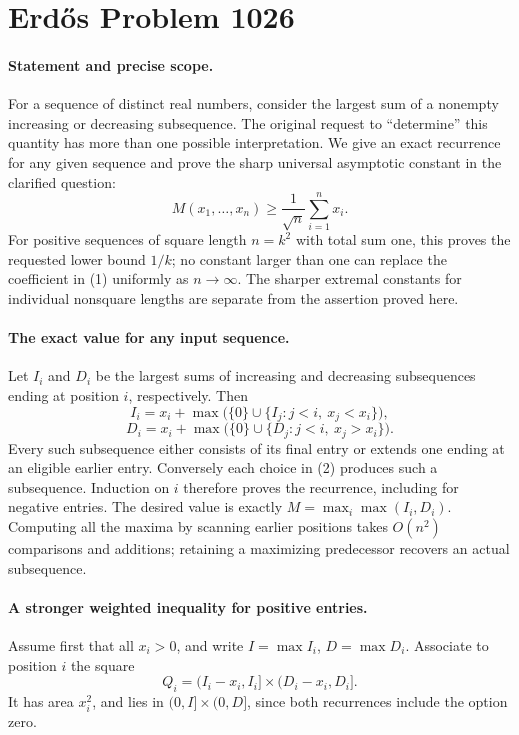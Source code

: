 \section*{Erd\H{o}s Problem 1026}

\paragraph{Statement and precise scope.}
For a sequence of distinct real numbers, consider the largest sum of a nonempty increasing or decreasing subsequence. The original request to ``determine'' this quantity has more than one possible interpretation. We give an exact recurrence for any given sequence and prove the sharp universal asymptotic constant in the clarified question:
\[
 M(x_1,\ldots,x_n)\geq\frac1{\sqrt n}\sum_{i=1}^n x_i.
 \tag{1}
\]
For positive sequences of square length \(n=k^2\) with total sum one, this proves the requested lower bound \(1/k\); no constant larger than one can replace the coefficient in (1) uniformly as \(n\to\infty\). The sharper extremal constants for individual nonsquare lengths are separate from the assertion proved here.

\paragraph{The exact value for any input sequence.}
Let \(I_i\) and \(D_i\) be the largest sums of increasing and decreasing subsequences ending at position \(i\), respectively. Then
\[
 I_i=x_i+\max\bigl(\{0\}\cup\{I_j:j<i,\ x_j<x_i\}\bigr),
\]
\[
 D_i=x_i+\max\bigl(\{0\}\cup\{D_j:j<i,\ x_j>x_i\}\bigr). \tag{2}
\]
Every such subsequence either consists of its final entry or extends one ending at an eligible earlier entry. Conversely each choice in (2) produces such a subsequence. Induction on \(i\) therefore proves the recurrence, including for negative entries. The desired value is exactly
\(M=\max_i\max(I_i,D_i)\). Computing all the maxima by scanning earlier positions takes \(O(n^2)\) comparisons and additions; retaining a maximizing predecessor recovers an actual subsequence.

\paragraph{A stronger weighted inequality for positive entries.}
Assume first that all \(x_i>0\), and write
\(I=\max I_i\), \(D=\max D_i\). Associate to position \(i\) the square
\[
 Q_i=(I_i-x_i,I_i]\times(D_i-x_i,D_i].
\]
It has area \(x_i^2\), and lies in \((0,I]\times(0,D]\), since both recurrences include the option zero.

